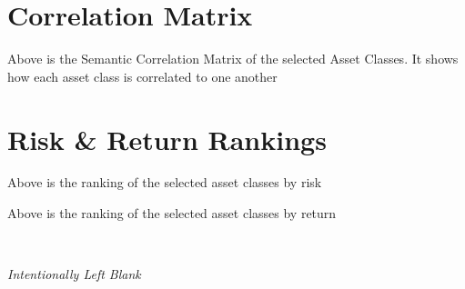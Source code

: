 \documentclass{article}
\begin{document}
\begin{landscape}

\section{Correlation Matrix}

\vspace{1cm}

\begin{center}


\scriptsize
\vspace{0.3cm}

    Above is the Semantic Correlation Matrix of the selected Asset Classes. It shows how each asset class is correlated to one another

\end{center}


\vspace{1cm}

\newpage  %

\section{Risk \& Return Rankings}

\vspace{2cm}

\begin{center}

\vspace{0.3cm}

    Above is the ranking of the selected asset classes by risk

\end{center}







\vspace{1cm}


\begin{center}

    \vspace{0.3cm}

    Above is the ranking of the selected asset classes by return

\end{center}

\end{landscape}
\newpage
\begin{center}
{\scshape\Large\bfseries \, \par}
	\vspace{10cm}
\emph{Intentionally Left Blank}

\end{center}
\end{document}
